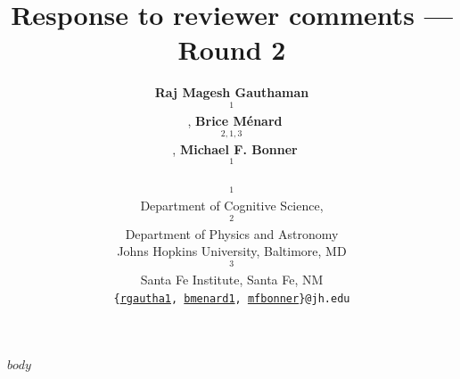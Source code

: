 \documentclass[10pt]{article}
\title{Response to reviewer comments --- Round 2}
\author{
    \textbf{Raj Magesh Gauthaman$$^1$$}~\orcidlink{0000-0001-7121-1532},
    \textbf{Brice Ménard$$^{2,1,3}$$}~\orcidlink{0000-0003-3164-6974},
    \textbf{Michael F. Bonner$$^1$$}~\orcidlink{0000-0002-4992-674X}\\
    $$^1$$Department of Cognitive Science,
    $$^2$$Department of Physics and Astronomy\\
    Johns Hopkins University, Baltimore, MD\\
    $$^3$$Santa Fe Institute, Santa Fe, NM\\
    \texttt{\{\href{mailto:rgautha1@jh.edu}{rgautha1}, \href{mailto:bmenard1@jh.edu}{bmenard1}, \href{mailto:mfbonner@jh.edu}{mfbonner}\}@jh.edu}
}
\date{}
\begin{document}
\maketitle

$body$

\newpage
\printbibliography
\end{document}
